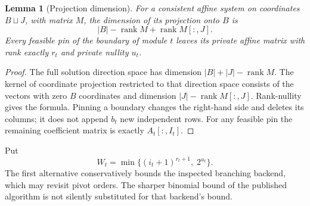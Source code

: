 \documentclass[11pt]{article}
\newtheorem{lemma}[theorem]{Lemma}
\begin{document}
\begin{lemma}[Projection dimension]
For a consistent affine system on coordinates $B\sqcup J$, with matrix $M$, the dimension of its projection onto $B$ is
\[
 |B|-\operatorname{rank}M+\operatorname{rank}M[:,J].
\]
Every feasible pin of the boundary of module $t$ leaves its private affine matrix with rank exactly $r_t$ and private nullity $u_t$.
\end{lemma}
\begin{proof}
The full solution direction space has dimension $|B|+|J|-\operatorname{rank}M$. The kernel of coordinate projection restricted to that direction space consists of the vectors with zero $B$ coordinates and dimension $|J|-\operatorname{rank}M[:,J]$. Rank-nullity gives the formula. Pinning a boundary changes the right-hand side and deletes its columns; it does not append $b_t$ new independent rows. For any feasible pin the remaining coefficient matrix is exactly $A_t[:,I_t]$.
\end{proof}

Put
\[
 W_t=\min\{(i_t+1)^{r_t+1},\;2^{u_t}\}.
\]
The first alternative conservatively bounds the inspected branching backend, which may revisit pivot orders. The sharper binomial bound of the published algorithm is not silently substituted for that backend's bound.
\end{document}
